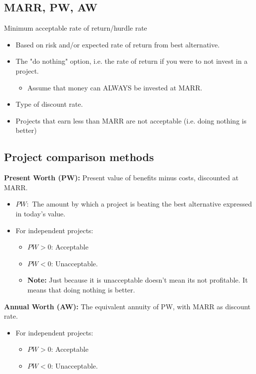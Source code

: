 \subsection{MARR, PW, AW}
\begin{terminology}
    Minimum acceptable rate of return/hurdle rate
        \begin{itemize}
            \item Based on risk and/or expected rate of return from best alternative.
            \item The "do nothing" option, i.e. the rate of return if you were to not invest in a project.
            \begin{itemize}
                \item Assume that money can ALWAYS be invested at MARR.
            \end{itemize}
            \item Type of discount rate.
            \item Projects that earn less than MARR are not acceptable (i.e. doing nothing is better)
        \end{itemize}          
\end{terminology}

\subsection{Project comparison methods}
\begin{definition}

    \textbf{Present Worth (PW):} Present value of benefits minus costs, discounted at MARR.
    \begin{itemize}
        \item $PW:$ The amount by which a project is beating the best alternative expressed in today's value.
        \item For independent projects:
            \begin{itemize}
                \item $PW > 0$: Acceptable
                \item $PW < 0$: Unacceptable.
            \end{itemize}
        \begin{itemize}
            \item \textbf{Note:} Just because it is unacceptable doesn't mean its not profitable. It means that doing nothing is better.
        \end{itemize}
    \end{itemize}
    \vspace{1em}

    \textbf{Annual Worth (AW):} The equivalent annuity of PW, with MARR as discount rate.
    \begin{itemize}
        \item For independent projects:
        \begin{itemize}
            \item $PW > 0$: Acceptable
            \item $PW < 0$: Unacceptable.
        \end{itemize}
    \end{itemize}
\end{definition}

